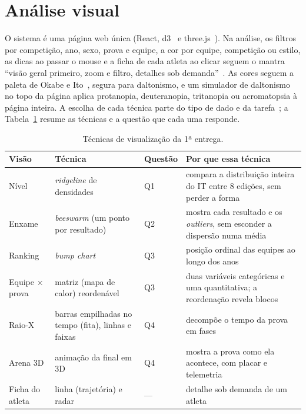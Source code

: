 \documentclass[11pt,a4paper]{article}
\begin{document}
\section{Análise visual}\label{sec:analise}

O sistema é uma página web única (React, d3~\cite{d3} e three.js~\cite{threejs}). Na análise, os filtros por
competição, ano, sexo, prova e equipe, a cor por equipe, competição ou estilo, as dicas ao passar o mouse e a
ficha de cada atleta ao clicar seguem o mantra ``visão geral primeiro, zoom e filtro, detalhes sob
demanda''~\cite{shneiderman}. As cores seguem a paleta de Okabe e Ito~\cite{okabe-ito}, segura para daltonismo, e um
simulador de daltonismo no topo da página aplica protanopia, deuteranopia, tritanopia ou acromatopsia à página
inteira. A escolha de cada técnica parte do tipo de dado e da tarefa~\cite{munzner}; a Tabela~\ref{tab:visoes} resume as
técnicas e a questão que cada uma responde.

\begin{table}[H]
\centering\small
\begin{tabular}{p{3.3cm}p{4.4cm}p{1.1cm}p{5.6cm}}
\toprule
Visão & Técnica & Questão & Por que essa técnica \\
\midrule
Nível & \emph{ridgeline} de densidades & Q1 & compara a distribuição inteira do IT entre 8 edições, sem perder a forma \\
Enxame & \emph{beeswarm} (um ponto por resultado) & Q2 & mostra cada resultado e os \emph{outliers}, sem esconder a dispersão numa média \\
Ranking & \emph{bump chart} & Q3 & posição ordinal das equipes ao longo dos anos \\
Equipe $\times$ prova & matriz (mapa de calor) reordenável & Q3 & duas variáveis categóricas e uma quantitativa; a reordenação revela blocos~\cite{behrisch} \\
Raio-X & barras empilhadas no tempo (fita), linhas e faixas & Q4 & decompõe o tempo da prova em fases \\
Arena 3D & animação da final em 3D & Q4 & mostra a prova como ela acontece, com placar e telemetria \\
Ficha do atleta & linha (trajetória) e radar & --- & detalhe sob demanda de um atleta \\
\bottomrule
\end{tabular}
\caption{Técnicas de visualização da 1ª entrega.}
\label{tab:visoes}
\end{table}
\end{document}
